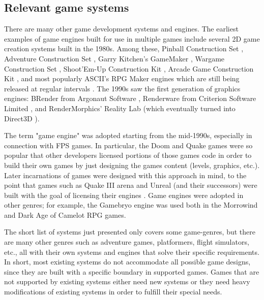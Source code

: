 \subsection{Relevant game systems}
There are many other game development systems and engines. The earliest examples of game engines built for use in multiple games include several 2D game creation systems built in the 1980s. Among these, Pinball Construction Set \cite{CHAPTER_3_PINBALL_CONSTRUCTION_SET}, Adventure Construction Set \cite{CHAPTER_3_ADVENTURE_CONSTRUCTION_SET}, Garry Kitchen's GameMaker \cite{CHAPTER_3_GARRY_KITCHENS_GAME_MAKER}, Wargame Construction Set \cite{CHAPTER_3_WARGAME_CONSTRUCTION_SET}, Shoot'Em-Up Construction Kit \cite{CHAPTER_3_SHOOT_EM_UP_CONSTRUCTION_KIT}, Arcade Game Construction Kit \cite{CHAPTER_3_ARCADE_GAME_CONSTRUCTION_KIT}, and most popularly ASCII's RPG Maker engines which are still being released at regular intervals \cite{CHAPTER_3_RPG_MAKER}.
The 1990s saw the first generation of graphics engines: BRender from Argonaut Software \cite{CHAPTER_3_BRENDER}, Renderware from Criterion Software Limited \cite{CHAPTER_3_RENDERWARE}, and RenderMorphics' Reality Lab \cite{CHAPTER_3_REALITY_LAB} (which eventually turned into Direct3D \cite{CHAPTER_3_REALITY_LAB_INTO_DIRECT3D}).

The term "game engine" was adopted starting from the mid-1990s, especially in connection with FPS games. In particular, the Doom and Quake games were so popular that other developers licensed portions of those games code in order to build their own games by just designing the games content (levels, graphics, etc.). Later incarnations of games were designed with this approach in mind, to the point that games such as Quake III arena and Unreal (and their successors) were built with the goal of licensing their engines \cite{CHAPTER_3_ID_TECH, CHAPTER_3_UNREAL_ENGINES}. Game engines were adopted in other genres; for example, the Gamebryo engine \cite{CHAPTER_3_GAMEBRYO} was used both in the Morrowind and Dark Age of Camelot RPG games.

The short list of systems just presented only covers some game-genres, but there are many other genres such as adventure games, platformers, flight simulators, etc., all with their own systems and engines that solve their specific requirements. In short, most existing systems do not accommodate all possible game designs, since they are built with a specific boundary in supported games. Games that are not supported by existing systems either need new systems or they need heavy modifications of existing systems in order to fulfill their special needs.

